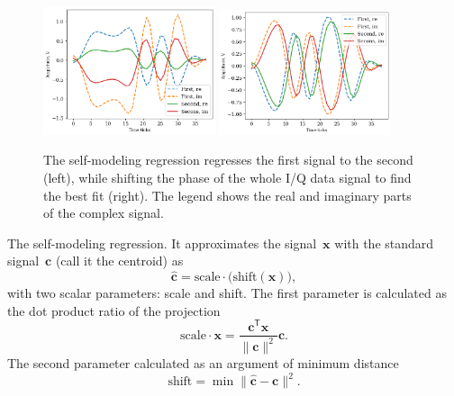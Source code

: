 \documentclass[12pt]{article}
\newcommand{\bw}{\mathbf{w}}
\newcommand{\bphi}{\boldsymbol{\varphi}}
\newcommand{\bx}{\mathbf{x}}
\newcommand{\bc}{\mathbf{c}}
\newcommand{\bd}{\mathbf{d}}
\begin{document}
\begin{figure}[!tp]
\centering
\includegraphics[width=0.45\textwidth]{fig_amplitude_scaled_distance}
\includegraphics[width=0.45\textwidth]{fig_centroid_still_in_cluster}
\caption{The self-modeling regression regresses the first signal to the second (left), while shifting the phase of the whole I/Q data signal to find the best fit (right). The legend shows the real and imaginary parts of the complex signal.}
\label{fig:projected_shift}
\end{figure}

The self-modeling regression. It approximates the signal~$\bx$ with the standard signal~$\bc$ (call it the centroid) as
\[
\hat{\mathbf{c}} = \text{scale} \cdot \bigl( \text{shift}(\mathbf{x})\bigr),
\]  
with two scalar parameters: scale and shift. The first parameter is calculated as the dot product ratio of the projection 
\[
\text{scale}\cdot \mathbf{x} = \frac{\mathbf{c}^\mathsf{T}\mathbf{x}}{\|\mathbf{c}\|^2}\mathbf{c}.
\]
The second parameter calculated as an argument of minimum distance
\[
\text{shift} =\mathop{\min}\|\hat{\mathbf{c}}-\mathbf{c}\|^2.
\]
\end{document}
